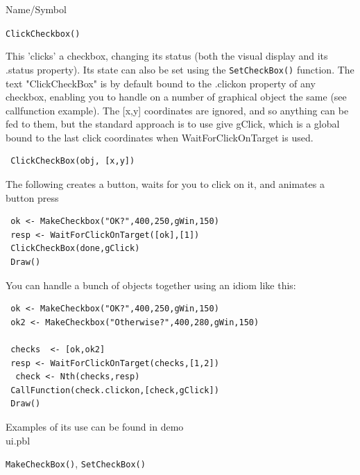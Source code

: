 \begin{desc}{Name/Symbol}
\item[Name/Symbol]  	\verb+ClickCheckbox()+

\item[Description]	
This 'clicks' a checkbox, changing its status (both the visual display and its .status property).   Its state can also be set using the \texttt{SetCheckBox()} function. The text "ClickCheckBox" is by default bound to the .clickon property of any checkbox, enabling you to handle on a number of graphical object the same (see callfunction example).   The [x,y] coordinates are ignored, and so anything can be fed to them, but the standard approach is to use give gClick, which is a global bound to the last click coordinates when WaitForClickOnTarget is used.

\item[Usage]
\begin{verbatim}
 ClickCheckBox(obj, [x,y])
  \end{verbatim}

\item[Example]      	
The following creates a button, waits for you to click on it, and animates a button press


\begin{verbatim}
 ok <- MakeCheckbox("OK?",400,250,gWin,150)
 resp <- WaitForClickOnTarget([ok],[1])
 ClickCheckBox(done,gClick) 
 Draw()
\end{verbatim}

You can handle a bunch of objects together using an idiom like this:
\begin{verbatim}
 ok <- MakeCheckbox("OK?",400,250,gWin,150)
 ok2 <- MakeCheckbox("Otherwise?",400,280,gWin,150)

 checks  <- [ok,ok2]
 resp <- WaitForClickOnTarget(checks,[1,2])
  check <- Nth(checks,resp) 
 CallFunction(check.clickon,[check,gClick]) 
 Draw()
\end{verbatim}


Examples of its use can be found in demo\\ui.pbl
\item[See Also]	\verb+MakeCheckBox()+, \verb+SetCheckBox()+
\end{desc}





